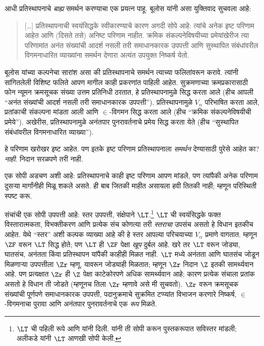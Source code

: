 \documentclass[../../../include/open-logic-section]{subfiles}
\begin{document}

आधी प्रतिस्थापनाचे \emph{बाह्य} समर्थन करण्याचा एक प्रयत्न पाहू. बूलोस यांनी असा युक्तिवाद सुचवला आहे:
\begin{quote}
  [\ldots] प्रतिस्थापनाची स्वयंसिद्धके स्वीकारण्याचे कारण अगदी सोपे आहे: त्यांचे अनेक इष्ट परिणाम आहेत आणि (दिसते तसे) अनिष्ट परिणाम नाहीत. क्रमिक संकल्पनेविषयीच्या प्रमेयांखेरीज त्या परिणामांत अनंत संख्यांची आदर्श नसली तरी समाधानकारक उपपत्ती आणि सुस्थापित संबंधांवरील विगमनाधारित व्याख्यांना समर्थन देणारा अत्यंत उपयुक्त निष्कर्ष येतो.
  \citep[229]{Boolos1971}
\end{quote}
बूलोस यांच्या कल्पनेचा सारांश असा की प्रतिस्थापनाचे समर्थन त्याच्या फलितांवरून करावे. त्यांनी सांगितलेली विशिष्ट फलिते आपण मागील काही प्रकरणांत पाहिली आहेत. सुक्रमणाच्या क्रमप्रकारासाठी फोन न्यूमन क्रमसूचक संख्या उत्तम प्रतिनिधी ठरतात, हे प्रतिस्थापनामुळे सिद्ध करता आले (हीच आपली ``अनंत संख्यांची आदर्श नसली तरी समाधानकारक उपपत्ती''). प्रतिस्थापनामुळे $V_\alpha$ परिभाषित करता आले, प्रतांकाची संकल्पना मांडता आली आणि $\in$-विगमन सिद्ध करता आले (हीच ``क्रमिक संकल्पनेविषयीची प्रमेये''). अखेरीस, प्रतिस्थापनामुळे अनंतपार पुनरावर्तनाचे प्रमेय सिद्ध करता येते (हीच ``सुस्थापित संबंधांवरील विगमनाधारित व्याख्या'').

हे परिणाम खरोखर इष्ट आहेत. पण इतके इष्ट परिणाम प्रतिस्थापनाला \emph{समर्थन} देण्यासाठी पुरेसे आहेत का? \emph{नाही}. निदान सरळपणे तरी नाही.

एक सोपी अडचण अशी आहे: प्रतिस्थापनाचे काही इष्ट परिणाम आपण मांडले, पण त्यांपैकी अनेक परिणाम दुसऱ्या मार्गांनीही मिळू शकले असते. ही बाब जितकी माहीत असायला हवी तितकी नाही; म्हणून परिस्थिती स्पष्ट करू.

संचांची एक सोपी उपपत्ती आहे: स्तर उपपत्ती, संक्षेपाने $\LT$.\footnote{$\LT$ ची पहिली रूपे \citet{Montague1965} आणि \citet{Scott1974} यांनी दिली. \citet{Potter2004} यांनी ती सोपी करून पुस्तकरूपात सविस्तर मांडली; अलीकडे \citet{ButtonLT1} यांनी $\LT$ आणखी सोपी केली.} $\LT$ ची स्वयंसिद्धके फक्त विस्तारात्मकता, विभक्तीकरण आणि प्रत्येक संच कोणत्या तरी \emph{स्तराचा} उपसंच असतो हे विधान इतकीच आहेत. येथे ``स्तर'' अशी कल्पक व्याख्या आहे की हे स्तर आपल्या परिचयाच्या $V_\alpha$ प्रमाणे वागतात. म्हणून $\ZF$ वरून $\LT$ सिद्ध होते; पण $\LT$ ही $\ZF$ पेक्षा \emph{खूप} दुर्बल आहे. खरे तर $\LT$ वरून जोड्या, घातसंच, अनंतता किंवा प्रतिस्थापन यांपैकी काहीही मिळत नाही. $\LT$ मध्ये अनंतता आणि घातसंच जोडून मिळणाऱ्या उपपत्तीला $\Zr$ म्हणू. यावरून जोड्याही मिळतात; म्हणून $\Zr$ निदान $\Z$ इतकी सामर्थ्यवान आहे. पण प्रत्यक्षात $\Zr$ ही $\Z$ पेक्षा काटेकोरपणे अधिक सामर्थ्यवान आहे; कारण प्रत्येक संचाला प्रतांक असतो हे विधान ती जोडते (म्हणूनच तिला $\Zr$ म्हणावे असे मी सुचवतो). $\Zr$ वरून क्रमसूचक संख्यांची पूर्णपणे समाधानकारक उपपत्ती, पदानुक्रमाचे सुक्रमित टप्प्यांत विभाजन करणारे निष्कर्ष, $\in$-विगमनाचा पुरावा आणि अनंतपार पुनरावर्तनाचे एक \emph{रूप} मिळते.
\end{document}
